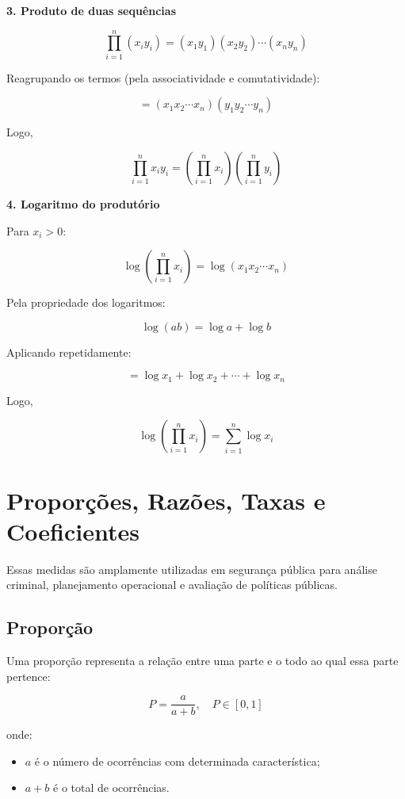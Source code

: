 \bigskip

\textbf{3. Produto de duas sequências}

\[
\prod_{i=1}^{n} (x_i y_i)
=
(x_1 y_1)(x_2 y_2)\cdots(x_n y_n)
\]

Reagrupando os termos (pela associatividade e comutatividade):

\[
=
(x_1 x_2 \cdots x_n)
(y_1 y_2 \cdots y_n)
\]

Logo,

\[
\prod_{i=1}^{n} x_i y_i
=
\left(\prod_{i=1}^{n} x_i\right)
\left(\prod_{i=1}^{n} y_i\right)
\]

\bigskip

\textbf{4. Logaritmo do produtório}

Para $x_i > 0$:

\[
\log \left( \prod_{i=1}^{n} x_i \right)
=
\log (x_1 x_2 \cdots x_n)
\]

Pela propriedade dos logaritmos:

\[
\log(ab) = \log a + \log b
\]

Aplicando repetidamente:

\[
=
\log x_1 + \log x_2 + \cdots + \log x_n
\]

Logo,

\[
\log \left( \prod_{i=1}^{n} x_i \right)
=
\sum_{i=1}^{n} \log x_i
\]


\section{Proporções, Razões, Taxas e Coeficientes}

Essas medidas são amplamente utilizadas em segurança pública para análise criminal, planejamento operacional e avaliação de políticas públicas.

\subsection{Proporção}

Uma proporção representa a relação entre uma parte e o todo ao qual essa parte pertence:

\[
P = \frac{a}{a+b}, \quad P \in [0,1]
\]

onde:
\begin{itemize}
\item $a$ é o número de ocorrências com determinada característica;
\item $a+b$ é o total de ocorrências.
\end{itemize}

